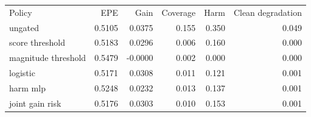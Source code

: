 \begin{tabular}{lrrrrr}\toprule
Policy & EPE & Gain & Coverage & Harm & Clean degradation \\
ungated & 0.5105 & 0.0375 & 0.155 & 0.350 & 0.049 \\
score threshold & 0.5183 & 0.0296 & 0.006 & 0.160 & 0.000 \\
magnitude threshold & 0.5479 & -0.0000 & 0.002 & 0.000 & 0.000 \\
logistic & 0.5171 & 0.0308 & 0.011 & 0.121 & 0.001 \\
harm mlp & 0.5248 & 0.0232 & 0.013 & 0.137 & 0.001 \\
joint gain risk & 0.5176 & 0.0303 & 0.010 & 0.153 & 0.001 \\
\bottomrule\end{tabular}
